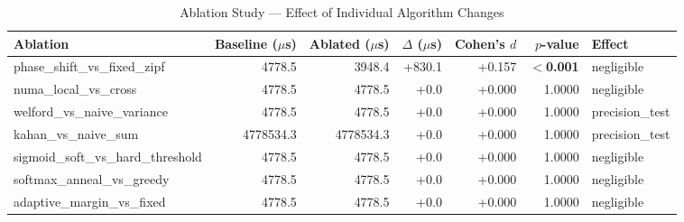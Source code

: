 \begin{table}[htbp]
\centering
\caption{Ablation Study — Effect of Individual Algorithm Changes}
\label{tab:ablation}
\begin{tabular}{lrrrrrl}
\toprule
Ablation & Baseline ($\mu$s) & Ablated ($\mu$s) & $\Delta$ ($\mu$s) & Cohen's $d$ & $p$-value & Effect \\
\midrule
  phase\_shift\_vs\_fixed\_zipf & 4778.5 & 3948.4 & +830.1 & +0.157 & \textbf{$<$0.001} & negligible \\
  numa\_local\_vs\_cross & 4778.5 & 4778.5 & +0.0 & +0.000 & 1.0000 & negligible \\
  welford\_vs\_naive\_variance & 4778.5 & 4778.5 & +0.0 & +0.000 & 1.0000 & precision_test \\
  kahan\_vs\_naive\_sum & 4778534.3 & 4778534.3 & +0.0 & +0.000 & 1.0000 & precision_test \\
  sigmoid\_soft\_vs\_hard\_threshold & 4778.5 & 4778.5 & +0.0 & +0.000 & 1.0000 & negligible \\
  softmax\_anneal\_vs\_greedy & 4778.5 & 4778.5 & +0.0 & +0.000 & 1.0000 & negligible \\
  adaptive\_margin\_vs\_fixed & 4778.5 & 4778.5 & +0.0 & +0.000 & 1.0000 & negligible \\
\bottomrule
\end{tabular}
\end{table}